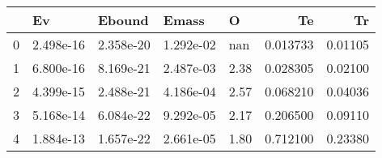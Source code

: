\begin{tabular}{lllllrr}
\toprule
{} &         Ev &     Ebound &      Emass &     O &        Te &       Tr \\
\midrule
0 &  2.498e-16 &  2.358e-20 &  1.292e-02 &   nan &  0.013733 &  0.01105 \\
1 &  6.800e-16 &  8.169e-21 &  2.487e-03 &  2.38 &  0.028305 &  0.02100 \\
2 &  4.399e-15 &  2.488e-21 &  4.186e-04 &  2.57 &  0.068210 &  0.04036 \\
3 &  5.168e-14 &  6.084e-22 &  9.292e-05 &  2.17 &  0.206500 &  0.09110 \\
4 &  1.884e-13 &  1.657e-22 &  2.661e-05 &  1.80 &  0.712100 &  0.23380 \\
\bottomrule
\end{tabular}
